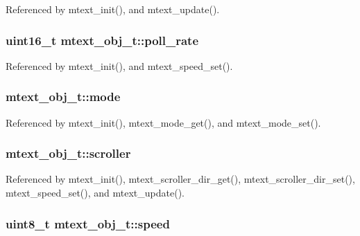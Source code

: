 Referenced by mtext\_\-init(), and mtext\_\-update().\hypertarget{structmtext__obj__t_1b64662fd292aea7a90652e601143f36}{
\subsubsection{\setlength{\rightskip}{0pt plus 5cm}uint16\_\-t {\bf mtext\_\-obj\_\-t::poll\_\-rate}}}
\label{structmtext__obj__t_1b64662fd292aea7a90652e601143f36}




Referenced by mtext\_\-init(), and mtext\_\-speed\_\-set().\hypertarget{structmtext__obj__t_2091c7edcdf0a78bc0c7798af6fca3b5}{
\subsubsection{ {\bf mtext\_\-obj\_\-t::mode}}}
\label{structmtext__obj__t_2091c7edcdf0a78bc0c7798af6fca3b5}




Referenced by mtext\_\-init(), mtext\_\-mode\_\-get(), and mtext\_\-mode\_\-set().\hypertarget{structmtext__obj__t_fa795a260168cc076d1b17e2e3b70d84}{
\subsubsection{ {\bf mtext\_\-obj\_\-t::scroller}}}
\label{structmtext__obj__t_fa795a260168cc076d1b17e2e3b70d84}




Referenced by mtext\_\-init(), mtext\_\-scroller\_\-dir\_\-get(), mtext\_\-scroller\_\-dir\_\-set(), mtext\_\-speed\_\-set(), and mtext\_\-update().\hypertarget{structmtext__obj__t_ad2f05313e8998327f0119f70cec688c}{
\subsubsection{\setlength{\rightskip}{0pt plus 5cm}uint8\_\-t {\bf mtext\_\-obj\_\-t::speed}}}
\label{structmtext__obj__t_ad2f05313e8998327f0119f70cec688c}




